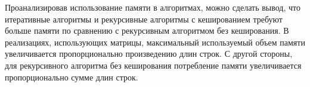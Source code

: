 Проанализировав использование памяти в алгоритмах, можно сделать вывод, что итеративные алгоритмы и рекурсивные алгоритмы с кешированием требуют больше памяти по сравнению с рекурсивным алгоритмом без кеширования. 
В реализациях, использующих матрицы, максимальный используемый объем памяти увеличивается пропорционально произведению длин строк. С другой стороны, для рекурсивного алгоритма без кеширования потребление памяти 
увеличивается пропорционально сумме длин строк.